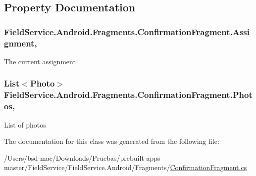 \subsection{Property Documentation}
\hypertarget{class_field_service_1_1_android_1_1_fragments_1_1_confirmation_fragment_a705b54cca438073dd71c47fa84b8cddc}{
\subsubsection[{Assignment}]{ Field\+Service.\+Android.\+Fragments.\+Confirmation\+Fragment.\+Assignment\hspace{0.3cm}{\ttfamily [get]}, {\ttfamily [set]}}}\label{class_field_service_1_1_android_1_1_fragments_1_1_confirmation_fragment_a705b54cca438073dd71c47fa84b8cddc}


The current assignment 

\hypertarget{class_field_service_1_1_android_1_1_fragments_1_1_confirmation_fragment_af6f4fa7e57cb6ca06c33e13319d5659c}{
\subsubsection[{Photos}]{\setlength{\rightskip}{0pt plus 5cm}List$<${\bf Photo}$>$ Field\+Service.\+Android.\+Fragments.\+Confirmation\+Fragment.\+Photos\hspace{0.3cm}{\ttfamily [get]}, {\ttfamily [set]}}}\label{class_field_service_1_1_android_1_1_fragments_1_1_confirmation_fragment_af6f4fa7e57cb6ca06c33e13319d5659c}


List of photos 



The documentation for this class was generated from the following file\+:\begin{DoxyCompactItemize}
\item 
/\+Users/bsd-\/mac/\+Downloads/\+Pruebas/prebuilt-\/apps-\/master/\+Field\+Service/\+Field\+Service.\+Android/\+Fragments/\hyperlink{_confirmation_fragment_8cs}{Confirmation\+Fragment.\+cs}\end{DoxyCompactItemize}
